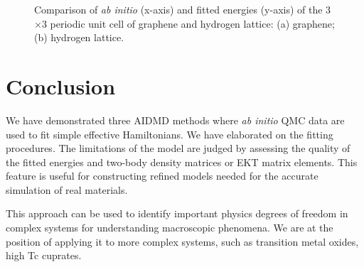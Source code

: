 \documentclass[aps, prb]{revtex4-1}
\begin{document}
\begin{figure}[htb]
\centering
{}
\caption{Comparison of \textit{ab initio} (x-axis) and fitted energies (y-axis) of the 3$\times$3 periodic unit cell of graphene and hydrogen lattice: (a) graphene; (b) hydrogen lattice.}\label{fig:ne_aidmd_gh}
\end{figure}

\section{Conclusion}
We have demonstrated three AIDMD methods where \textit{ab initio} QMC data are used to fit simple effective Hamiltonians. We have elaborated on the fitting procedures. The limitations of the model are judged by assessing the quality of the fitted energies and two-body density matrices or EKT matrix elements. This feature is useful for constructing refined models needed for the accurate simulation of real materials.

This approach can be used to identify important physics degrees of freedom in complex systems for understanding macroscopic phenomena. We are at the position of applying it to more complex systems, such as transition metal oxides, high Tc cuprates. 
%


\end{document}
